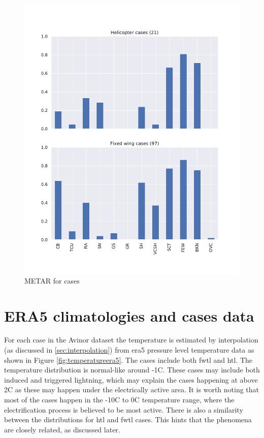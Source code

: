 \begin{figure}
    \centering
    \includegraphics[width=\textwidth]{Figures/METARcases.pdf}
    \caption{METAR for cases}
    \label{fig:metarcases}
\end{figure}

\section{ERA5 climatologies and cases data}\label{sec:era5results}
For each case in the Avinor dataset the temperature is estimated by interpolation (as discussed in \ref{sec:interpolation}) from \acrshort{era5} pressure level temperature data as shown in Figure \ref{fig:temperatureera5}. The cases include both \acrshort{fwtl} and \acrshort{htl}. The temperature distribution is normal-like around -1C. These cases may include both induced and triggered lightning, which may explain the cases happening at above 2C as these may happen under the electrically active area. It is worth noting that most of the cases happen in the -10C to 0C temperature range, where the electrification process is believed to be most active. There is also a similarity between the distributions for \acrshort{htl} and \acrshort{fwtl} cases. This hints that the phenomena are closely related, as discussed later.

